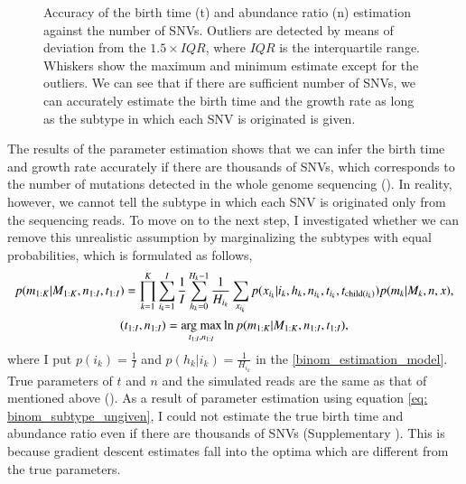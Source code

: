 \documentclass{article}
\begin{document}
\begin{figure}[H]
   \caption{
 Accuracy of the birth time (t) and abundance ratio (n) estimation against the number of SNVs. Outliers are detected by means of deviation from the $1.5 \times IQR$, where $IQR$ is the interquartile range. Whiskers show the maximum and minimum estimate except for the outliers. We can see that if there are sufficient number of SNVs, we can accurately estimate the birth time and the growth rate as long as the subtype in which each SNV is originated is given.
  }
 \label{fig: binom_subtype_given}
\end{figure}

The results of the parameter estimation shows that we can infer the birth time and growth rate accurately if there are thousands of SNVs, which corresponds to the number of mutations detected in the whole genome sequencing ().
In reality, however, we cannot tell the subtype in which each SNV is originated only from the sequencing reads.
To move on to the next step, I investigated whether we can remove this unrealistic assumption by marginalizing the subtypes with equal probabilities, which is formulated as follows,
\begin{gather}
 p(m_{1:K}|M_{1:K}, n_{1:I}, t_{1:I}) = \prod_{k=1}^{K} \sum_{i_k=1}^{I} \frac{1}{I} \sum_{h_k=0}^{H_k-1} \frac{1}{H_{i_k}} \sum_{x_{i_k}} p(x_{i_k} | i_k, h_k, n_{i_k}, t_{i_k}, t_{\mathrm{child}(i_k)}) p (m_k | M_k, n, x),\label{eq: binom_subtype_ungiven}\\
 (t_{1:I}, n_{1:I}) = \mathop{\rm arg~max}\limits_{t_{1:I}, n_{1:I}} \ln p(m_{1:K} | M_{1:K}, n_{1:I}, t_{1:I}),
\end{gather}
where I put $p(i_k) = \frac{1}{I}$ and $p(h_k | i_k) = \frac{1}{H_{i_k}}$ in the \eqref{binom_estimation_model}.
True parameters of $t$ and $n$ and the simulated reads are the same as that of mentioned above ().
As a result of parameter estimation using equation \eqref{eq: binom_subtype_ungiven}, I could not estimate the true birth time and abundance ratio even if there are thousands of SNVs (Supplementary ).
This is because gradient descent estimates fall into the optima which are different from the true parameters.
\end{document}
